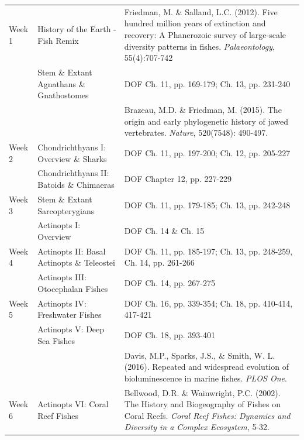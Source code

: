 \documentclass[letterpaper]{inzane_syllabus} %
\begin{document}
\begin{center}
\begin{tabularx}{\textwidth}{p{2cm}p{8cm}p{9.5cm}} %
\arrayrulecolor{myCOLOR}\hline
\multicolumn{3}{l}{\textbf{\textcolor{myCOLOR}{\large MODULE 1: Life's Building Blocks }}} \\
\hline
Week 1 & History of the Earth - Fish Remix & Friedman, M. \& Salland, L.C. (2012). Five hundred million years of extinction and recovery: A Phanerozoic survey of large-scale diversity patterns in fishes. \textit{Palaeontology}, 55(4):707-742 \\

& Stem \& Extant Agnathans \& Gnathostomes & DOF Ch. 11, pp. 169-179; Ch. 13, pp. 231-240  \\
& & Brazeau, M.D. \& Friedman, M. (2015). The origin and early phylogenetic history of jawed vertebrates. \textit{Nature}, 520(7548): 490-497.\\
\arrayrulecolor{maingray}\hline
Week 2 & Chondrichthyans I: Overview \& Sharks & DOF Ch. 11, pp. 197-200; Ch. 12, pp. 205-227\\

& Chondrichthyans II: Batoids \& Chimaeras & DOF Chapter 12, pp. 227-229 \\
\arrayrulecolor{maingray}\hline
Week 3 & Stem \& Extant Sarcopterygians & DOF Ch. 11, pp. 179-185; Ch. 13, pp. 242-248 \\

& Actinopts I: Overview & DOF Ch. 14 \& Ch. 15 \\
\arrayrulecolor{maingray}\hline
Week 4 & Actinopts II: Basal Actinopts \& Teleostei & DOF Ch. 11, pp. 185-197; Ch. 13, pp. 248-259, Ch. 14, pp. 261-266 \\

& Actinopts III: Otocephalan Fishes & DOF Ch. 14, pp. 267-275 \\

\arrayrulecolor{maingray}\hline
Week 5 & Actinopts IV: Freshwater Fishes & DOF Ch. 16, pp. 339-354; Ch. 18, pp. 410-414, 417-421 \\

& Actinopts V: Deep Sea Fishes & DOF Ch. 18, pp. 393-401 \\
& & Davis, M.P., Sparks, J.S., \& Smith, W. L. (2016). Repeated and widespread evolution of bioluminescence in marine fishes. \textit{PLOS One}.\\
\arrayrulecolor{maingray}\hline
Week 6 & Actinopts VI: Coral Reef Fishes & Bellwood, D.R. \& Wainwright, P.C. (2002). The History and Biogeography of Fishes on Coral Reefs. \textit{Coral Reef Fishes: Dynamics and Diversity in a Complex Ecosystem}, 5-32. \\


\end{tabularx}
\end{center}
\end{document}
